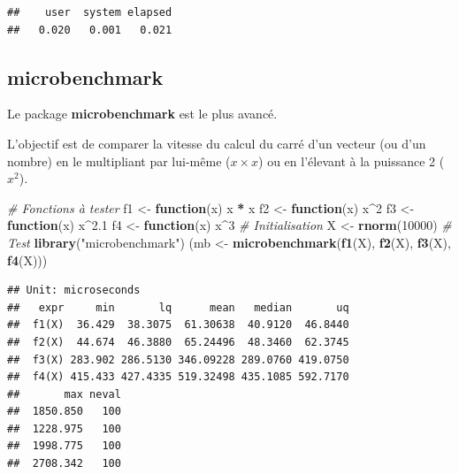 \documentclass[
  12pt,
  french,
  a4paper,
  extrafontsizes,onecolumn,openright
  ]{memoir}
\newenvironment{Shaded}{\begin{snugshade}}{\end{snugshade}}
\newcommand{\CommentTok}[1]{\textcolor[rgb]{0.56,0.35,0.01}{\textit{#1}}}
\newcommand{\ControlFlowTok}[1]{\textcolor[rgb]{0.13,0.29,0.53}{\textbf{#1}}}
\newcommand{\DecValTok}[1]{\textcolor[rgb]{0.00,0.00,0.81}{#1}}
\newcommand{\FloatTok}[1]{\textcolor[rgb]{0.00,0.00,0.81}{#1}}
\newcommand{\KeywordTok}[1]{\textcolor[rgb]{0.13,0.29,0.53}{\textbf{#1}}}
\newcommand{\NormalTok}[1]{#1}
\newcommand{\OperatorTok}[1]{\textcolor[rgb]{0.81,0.36,0.00}{\textbf{#1}}}
\newcommand{\StringTok}[1]{\textcolor[rgb]{0.31,0.60,0.02}{#1}}
\begin{document}
\begin{verbatim}
##    user  system elapsed 
##   0.020   0.001   0.021
\end{verbatim}

\normalsize

\hypertarget{microbenchmark}{%
\subsection{microbenchmark}\label{microbenchmark}}

Le package \textbf{microbenchmark} est le plus avancé.

L'objectif est de comparer la vitesse du calcul du carré d'un vecteur (ou d'un nombre) en le multipliant par lui-même (\(x \times x\)) ou en l'élevant à la puissance 2 (\(x^2\)).

\scriptsize

\begin{Shaded}
\begin{Highlighting}[]
\CommentTok{# Fonctions à tester}
\NormalTok{f1 <-}\StringTok{ }\ControlFlowTok{function}\NormalTok{(x) x }\OperatorTok{*}\StringTok{ }\NormalTok{x}
\NormalTok{f2 <-}\StringTok{ }\ControlFlowTok{function}\NormalTok{(x) x}\OperatorTok{^}\DecValTok{2}
\NormalTok{f3 <-}\StringTok{ }\ControlFlowTok{function}\NormalTok{(x) x}\OperatorTok{^}\FloatTok{2.1}
\NormalTok{f4 <-}\StringTok{ }\ControlFlowTok{function}\NormalTok{(x) x}\OperatorTok{^}\DecValTok{3}
\CommentTok{# Initialisation}
\NormalTok{X <-}\StringTok{ }\KeywordTok{rnorm}\NormalTok{(}\DecValTok{10000}\NormalTok{)}
\CommentTok{# Test}
\KeywordTok{library}\NormalTok{(}\StringTok{"microbenchmark"}\NormalTok{)}
\NormalTok{(mb <-}\StringTok{ }\KeywordTok{microbenchmark}\NormalTok{(}\KeywordTok{f1}\NormalTok{(X), }\KeywordTok{f2}\NormalTok{(X), }\KeywordTok{f3}\NormalTok{(X), }\KeywordTok{f4}\NormalTok{(X)))}
\end{Highlighting}
\end{Shaded}

\begin{verbatim}
## Unit: microseconds
##   expr     min       lq      mean   median       uq
##  f1(X)  36.429  38.3075  61.30638  40.9120  46.8440
##  f2(X)  44.674  46.3880  65.24496  48.3460  62.3745
##  f3(X) 283.902 286.5130 346.09228 289.0760 419.0750
##  f4(X) 415.433 427.4335 519.32498 435.1085 592.7170
##       max neval
##  1850.850   100
##  1228.975   100
##  1998.775   100
##  2708.342   100
\end{verbatim}

\normalsize
\end{document}
